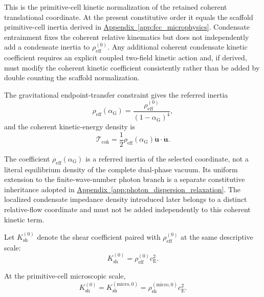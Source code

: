 This is the primitive-cell kinetic normalization of the retained coherent translational coordinate. At the present constitutive order it equals the scaffold primitive-cell inertia derived in \hyperref[app:fcc_microphysics]{Appendix~\ref*{app:fcc_microphysics}}. Condensate entrainment fixes the coherent relative kinematics but does not independently add a condensate inertia to $\rho_{\mathrm{eff}}^{(0)}$. Any additional coherent condensate kinetic coefficient requires an explicit coupled two-field kinetic action and, if derived, must modify the coherent kinetic coefficient consistently rather than be added by double counting the scaffold normalization.

The gravitational endpoint-transfer constraint gives the referred inertia
\begin{equation}
    \rho_{\mathrm{eff}}(\alpha_{\mathrm{G}})
    =
    \frac{\rho_{\mathrm{eff}}^{(0)}}
    {(1-\alpha_{\mathrm{G}})^4},
\end{equation}
and the coherent kinetic-energy density is
\begin{equation}
    \mathcal{T}_{\mathrm{coh}}
    =
    \frac{1}{2}
    \rho_{\mathrm{eff}}(\alpha_{\mathrm{G}})
    \dot{\mathbf{u}}\cdot\dot{\mathbf{u}}.
\end{equation}

The coefficient $\rho_{\mathrm{eff}}(\alpha_{\mathrm{G}})$ is a referred inertia of the selected coordinate, not a literal equilibrium density of the complete dual-phase vacuum. Its uniform extension to the finite-wave-number photon branch is a separate constitutive inheritance adopted in \hyperref[app:photon_dispersion_relaxation]{Appendix~\ref*{app:photon_dispersion_relaxation}}. The localized condensate impedance density introduced later belongs to a distinct relative-flow coordinate and must not be added independently to this coherent kinetic term.

Let $K_{\mathrm{sh}}^{(0)}$ denote the shear coefficient paired with $\rho_{\mathrm{eff}}^{(0)}$ at the same descriptive scale:
\begin{equation}
    K_{\mathrm{sh}}^{(0)}
    =
    \rho_{\mathrm{eff}}^{(0)}c_{\mathrm{E}}^2.
\end{equation}

At the primitive-cell microscopic scale,
\begin{equation}
    K_{\mathrm{sh}}^{(0)}
    =
    K_{\mathrm{sh}}^{(\mathrm{micro},0)}
    =
    \rho_{\mathrm{sh}}^{(\mathrm{micro},0)}c_{\mathrm{E}}^2.
\end{equation}

